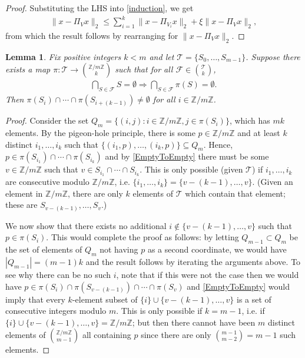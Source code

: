 \documentclass[journal, onecolumn]{IEEEtran}
\newtheorem{lemma}{Lemma}
\begin{document}
\begin{proof}
Substituting the LHS into \eqref{induction}, we get
\begin{align*}
\|x - \Pi_Vx\|_2 \leq \sum_{i=1}^k \|x - \Pi_{V_i} x\|_2 + \xi \|x - \Pi_Vx\|_2,
\end{align*}
%
from which the result follows by rearranging for $\|x - \Pi_Vx\|_2$.
\end{proof}


\begin{lemma}\label{NonEmptyLemma} Fix positive integers $k < m$ and let $\mathcal{T} = \{S_0, \ldots, S_{m-1}\}$. Suppose there exists a map $\pi: \mathcal{T} \to {\mathbb{Z}/m\mathbb{Z} \choose k}$ such that for all $ \mathcal{F} \in {\mathcal{T} \choose k}$,
\begin{align}\label{EmptyToEmpty}
 \bigcap_{S \in \mathcal{F}} S = \emptyset \Longrightarrow \bigcap_{S \in \mathcal{F}} \pi(S) = \emptyset.
\end{align}
%
Then  $\pi(S_i) \cap \cdots \cap \pi(S_{i+(k-1)}) \neq \emptyset$ for all $i \in \mathbb{Z}/m\mathbb{Z}$.
\end{lemma}

\begin{proof} Consider the set $Q_m = \{ (i,j) : i \in \mathbb{Z}/m\mathbb{Z}, j \in \pi(S_i) \}$, which has $mk$ elements. By the pigeon-hole principle, there is some $p \in \mathbb{Z}/m\mathbb{Z}$ and at least $k$ distinct $i_1, \ldots, i_k$ such that $\{(i_1, p), \ldots, (i_k, p)\} \subseteq Q_m$. Hence, $p \in \pi(S_{i_1}) \cap \cdots \cap \pi(S_{i_k})$ and by \eqref{EmptyToEmpty} there must be some $v \in \mathbb{Z}/m\mathbb{Z}$ such that $v \in S_{i_1} \cap \cdots \cap S_{i_k}$. This is only possible (given $\mathcal{T}$) if $i_1, \ldots, i_k$ are consecutive modulo $\mathbb{Z}/m\mathbb{Z}$, i.e. $\{i_1, \ldots, i_k\} = \{v - (k-1), \ldots, v\}$. (Given an element in $\mathbb{Z}/m\mathbb{Z}$, there are only $k$ elements of $\mathcal{T}$ which contain that element; these are $S_{v-(k-1)}, \ldots, S_v$.)

We now show that there exists no additional $i \notin \{v - (k-1), \ldots, v\}$ such that $p \in \pi(S_{i})$. This would complete the proof as follows: by letting $Q_{m-1} \subset Q_m$ be the set of elements of $Q_m$ not having $p$ as a second coordinate, we would have $|Q_{m-1}| = (m-1)k$ and the result follows by iterating the arguments above. To see why there can be no such $i$, note that if this were not the case then we would have $p \in \pi(S_{i}) \cap \pi(S_{v - (k-1)}) \cap \cdots \cap \pi(S_{v})$ and \eqref{EmptyToEmpty} would imply that every $k$-element subset of $\{i\} \cup \{v-(k-1), \ldots, v\}$ is a set of consecutive integers modulo $m$. This is only possible if $k = m-1$, i.e. if $\{i\} \cup \{v-(k-1), \ldots, v\} = \mathbb{Z}/m\mathbb{Z}$; but then there cannot have been $m$ distinct elements of ${\mathbb{Z}/m\mathbb{Z} \choose m-1}$ all containing $p$ since there are only ${m-1 \choose m-2}  = m-1$ such elements.
\end{proof}
\end{document}
